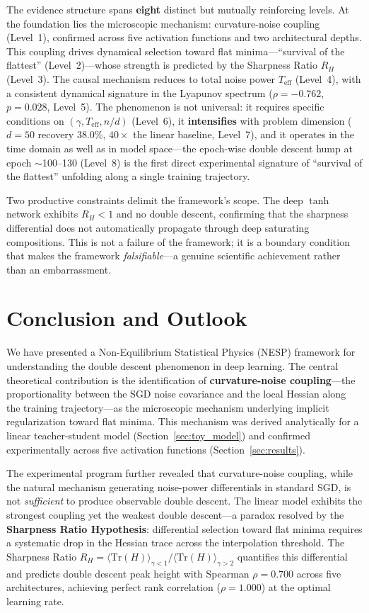 \documentclass[
  journal=largetwo,
  simfonts=false,
  year=2025,
  volume=37,
]{cup-journal}
\begin{document}
The evidence structure spans \textbf{eight} distinct but mutually reinforcing levels. At the foundation lies the microscopic mechanism: curvature-noise coupling (Level~1), confirmed across five activation functions and two architectural depths. This coupling drives dynamical selection toward flat minima---``survival of the flattest'' (Level~2)---whose strength is predicted by the Sharpness Ratio $R_H$ (Level~3). The causal mechanism reduces to total noise power $T_{\mathrm{eff}}$ (Level~4), with a consistent dynamical signature in the Lyapunov spectrum ($\rho=-0.762$, $p=0.028$, Level~5). The phenomenon is not universal: it requires specific conditions on $(\gamma, T_{\mathrm{eff}}, n/d)$ (Level~6), it \textbf{intensifies} with problem dimension ($d=50$ recovery $38.0\%$, $40\times$ the linear baseline, Level~7), and it operates in the time domain as well as in model space---the epoch-wise double descent hump at epoch $\sim$100--130 (Level~8) is the first direct experimental signature of ``survival of the flattest'' unfolding along a single training trajectory.

Two productive constraints delimit the framework's scope. The deep $\tanh$ network exhibits $R_H < 1$ and no double descent, confirming that the sharpness differential does not automatically propagate through deep saturating compositions. This is not a failure of the framework; it is a boundary condition that makes the framework \emph{falsifiable}---a genuine scientific achievement rather than an embarrassment.

\newpage
\section{Conclusion and Outlook}\label{sec:conclusion}

We have presented a Non-Equilibrium Statistical Physics (NESP) framework for understanding the double descent phenomenon in deep learning. The central theoretical contribution is the identification of \textbf{curvature-noise coupling}---the proportionality between the SGD noise covariance and the local Hessian along the training trajectory---as the microscopic mechanism underlying implicit regularization toward flat minima. This mechanism was derived analytically for a linear teacher-student model (Section~\ref{sec:toy_model}) and confirmed experimentally across five activation functions (Section~\ref{sec:results}).

The experimental program further revealed that curvature-noise coupling, while the natural mechanism generating noise-power differentials in standard SGD, is not \textit{sufficient} to produce observable double descent. The linear model exhibits the strongest coupling yet the weakest double descent---a paradox resolved by the \textbf{Sharpness Ratio Hypothesis}: differential selection toward flat minima requires a systematic drop in the Hessian trace across the interpolation threshold. The Sharpness Ratio $R_H = \langle\mathrm{Tr}(H)\rangle_{\gamma<1} / \langle\mathrm{Tr}(H)\rangle_{\gamma>2}$ quantifies this differential and predicts double descent peak height with Spearman $\rho = 0.700$ across five architectures, achieving perfect rank correlation ($\rho = 1.000$) at the optimal learning rate.
\end{document}
